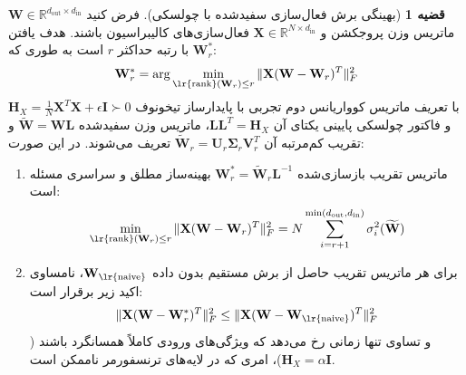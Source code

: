 \documentclass[12pt,a4paper]{report}
\theoremstyle{definition}
\newtheorem{theorem}{قضیه}[chapter]
\begin{document}
\begin{theorem}[بهینگی برش فعال‌سازی سفیدشده با چولسکی]
\label{thm:svdllm_v2_optimality}
فرض کنید $\mathbf{W} \in \mathbb{R}^{d_{\text{out}} \times d_{\text{in}}}$ ماتریس وزن پروجکشن و $\mathbf{X} \in \mathbb{R}^{N \times d_{\text{in}}}$ فعال‌سازی‌های کالیبراسیون باشند. هدف یافتن $\mathbf{W}_r^*$ با رتبه حداکثر $r$ است به طوری که:
\begin{equation}
\mathbf{W}_r^* = \arg\min_{\text{\lr{rank}}(\mathbf{W}_r) \le r} \|\mathbf{X}(\mathbf{W} - \mathbf{W}_r)^T\|_F^2
\end{equation}
با تعریف ماتریس کوواریانس دوم تجربی با پایدارساز تیخونوف $\mathbf{H}_X = \frac{1}{N}\mathbf{X}^T\mathbf{X} + \epsilon \mathbf{I} \succ 0$ و فاکتور چولسکی پایینی یکتای آن $\mathbf{L}\mathbf{L}^T = \mathbf{H}_X$، ماتریس وزن سفیدشده $\widetilde{\mathbf{W}} = \mathbf{W}\mathbf{L}$ و تقریب کم‌مرتبه آن $\widetilde{\mathbf{W}}_r = \mathbf{U}_r \mathbf{\Sigma}_r \mathbf{V}_r^T$ تعریف می‌شوند. در این صورت:
\begin{enumerate}
    \item ماتریس تقریب بازسازی‌شده $\mathbf{W}_r^* = \widetilde{\mathbf{W}}_r \mathbf{L}^{-1}$ بهینه‌ساز مطلق و سراسری مسئله است:
    \begin{equation}
    \min_{\text{\lr{rank}}(\mathbf{W}_r) \le r} \|\mathbf{X}(\mathbf{W} - \mathbf{W}_r)^T\|_F^2 = N \sum_{i=r+1}^{\min(d_{\text{out}}, d_{\text{in}})} \sigma_i^2(\widetilde{\mathbf{W}})
    \end{equation}
    \item برای هر ماتریس تقریب حاصل از برش مستقیم بدون داده $\mathbf{W}_{\text{\lr{naive}}}$، نامساوی اکید زیر برقرار است:
    \begin{equation}
    \|\mathbf{X}(\mathbf{W} - \mathbf{W}_r^*)^T\|_F^2 \le \|\mathbf{X}(\mathbf{W} - \mathbf{W}_{\text{\lr{naive}}})^T\|_F^2
    \end{equation}
    و تساوی تنها زمانی رخ می‌دهد که ویژگی‌های ورودی کاملاً همسانگرد باشند ($\mathbf{H}_X = \alpha \mathbf{I}$)، امری که در لایه‌های ترنسفورمر ناممکن است.
\end{enumerate}
\end{theorem}
\end{document}

